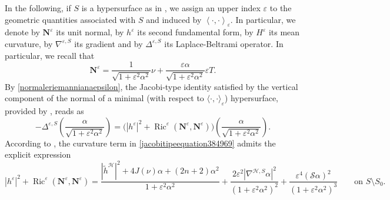 \documentclass[11pt]{amsart}
\newcommand{\hhh}{{\mathcal{H}}}
\newcommand{\n}[1]{\nabla^\varepsilon_{ #1 }}
\newcommand{\vh}{\nu}
\newcommand{\eps}{\varepsilon}
\newcommand{\s}{\mathcal S}
\renewcommand{\n}{\mathbf{N}}
\DeclareMathOperator{\ric}{Ric}
\theoremstyle{definition}
\theoremstyle{remark}
\numberwithin{equation}{section}
\begin{document}
 In the following, if $S$ is a hypersurface as in , we assign an upper index $\eps$ to the geometric quantities associated with $S$ and induced by $\left\langle\cdot,\cdot\right\rangle_\eps$. In particular, we denote by $\n^\eps$ its unit normal, by $h^\eps$ its second fundamental form, by $H^\eps$ its mean curvature, by $\nabla^{\eps,S}$ its gradient and by $\Delta^{\eps,S}$ its Laplace-Beltrami operator. In particular, we recall \cite{formuledivariazioneriem} that 
\begin{equation}\label{normaleriemannianaepsilon}
    \n^\eps=\frac{1}{\sqrt{1+\eps^2\alpha^2}}\vh+\frac{\eps\alpha}{\sqrt{1+\eps^2\alpha^2}}\eps T.
\end{equation}
   By \eqref{normaleriemannianaepsilon}, the Jacobi-type identity satisfied by the vertical component of the normal of a minimal (with respect to $\langle\cdot,\cdot\rangle_\eps$) hypersurface, provided by \cite[(1.5)]{MR5029815}, reads as 
    \begin{equation}\label{jacobitipeequation384969}
        -\Delta^{\eps,S}\left(\frac{\alpha}{\sqrt{1+\eps^2\alpha^2}}\right)=\Big(\left|h^\eps\right|^2+\ric^\eps(\n^\eps,\n^\eps)\Big)\left(\frac{\alpha}{\sqrt{1+\eps^2\alpha^2}}\right).
    \end{equation}
    According to \cite[Lemma 3.7]{formuledivariazioneriem}, the curvature term in \eqref{jacobitipeequation384969} admits the explicit expression
\begin{equation}\label{riemcurvaturetermspresoda3949596}
        \left|h^\eps\right|^2+\ric^\eps(\n^\eps,\n^\eps)=\frac{|\tilde h^\hhh|^2+4 J(\vh)\alpha+(2n+2)\alpha^2}{1+\eps^2\alpha^2}+\frac{2\eps^2\left|\nabla^{\hhh,S}\alpha\right|^2}{\left(1+\eps^2\alpha^2\right)^2}+\frac{\eps^4\left(\s\alpha\right)^2}{\left(1+\eps^2\alpha^2\right)^3}\qquad \text{on }S\setminus S_0.
    \end{equation}
 
\end{document}
